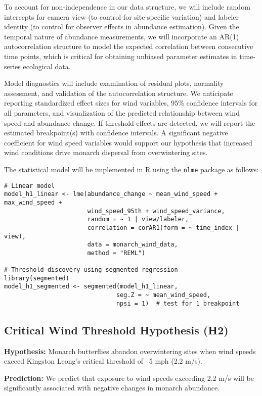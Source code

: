 To account for non-independence in our data structure, we will include random intercepts for camera view (to control for site-specific variation) and labeler identity (to control for observer effects in abundance estimation). Given the temporal nature of abundance measurements, we will incorporate an AR(1) autocorrelation structure to model the expected correlation between consecutive time points, which is critical for obtaining unbiased parameter estimates in time-series ecological data.

Model diagnostics will include examination of residual plots, normality assessment, and validation of the autocorrelation structure. We anticipate reporting standardized effect sizes for wind variables, 95\% confidence intervals for all parameters, and visualization of the predicted relationship between wind speed and abundance change. If threshold effects are detected, we will report the estimated breakpoint(s) with confidence intervals. A significant negative coefficient for wind speed variables would support our hypothesis that increased wind conditions drive monarch dispersal from overwintering sites.

The statistical model will be implemented in R using the \texttt{nlme} package as follows:

\begin{verbatim}
# Linear model
model_h1_linear <- lme(abundance_change ~ mean_wind_speed + max_wind_speed + 
                       wind_speed_95th + wind_speed_variance,
                       random = ~ 1 | view/labeler,
                       correlation = corAR1(form = ~ time_index | view),
                       data = monarch_wind_data,
                       method = "REML")

# Threshold discovery using segmented regression
library(segmented)
model_h1_segmented <- segmented(model_h1_linear, 
                               seg.Z = ~ mean_wind_speed,
                               npsi = 1)  # test for 1 breakpoint
\end{verbatim}

\subsection{Critical Wind Threshold Hypothesis (H2)}

\textbf{Hypothesis:} Monarch butterflies abandon overwintering sites when wind speeds exceed Kingston Leong's critical threshold of ~5 mph (2.2 m/s).

\textbf{Prediction:} We predict that exposure to wind speeds exceeding 2.2 m/s will be significantly associated with negative changes in monarch abundance.

